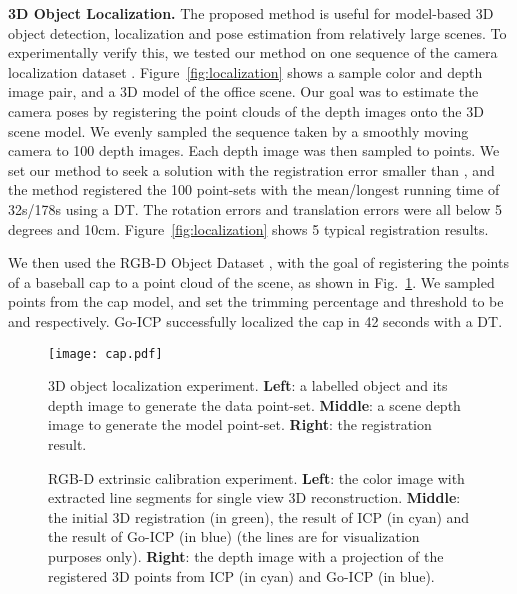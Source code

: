 \documentclass[10pt,journal,cspaper,compsoc]{IEEEtran}
\begin{document}
\vspace{0.06in}
\noindent\textbf{3D Object Localization.}
The proposed method is useful for model-based 3D object detection, localization and pose estimation from relatively large scenes. To experimentally verify this, we tested our method on one sequence of the camera localization dataset \cite{shotton2013scene}. Figure~\ref{fig:localization} shows a sample color and depth image pair, and a 3D model of the office scene. Our goal was to estimate the camera poses by registering the point clouds of the depth images onto the 3D scene model. We evenly sampled the sequence taken by a smoothly moving camera to 100 depth images. Each depth image was then sampled to  points. We set our method to seek a solution with the registration error smaller than , and the method registered the 100 point-sets with the mean/longest running time of 32s/178s using a DT. The rotation errors and translation errors were all below 5 degrees and 10cm. Figure~\ref{fig:localization} shows 5 typical registration results.

We then used the RGB-D Object Dataset \cite{lai2011large}, with the goal of registering the points of a baseball cap to a point cloud of the scene, as shown in Fig.~\ref{fig:cap}. We sampled  points from the cap model, and set the trimming percentage and threshold to be  and  respectively. Go-ICP successfully localized the cap in 42 seconds with a DT.

\begin{figure}[!t]
\begin{center}
\texttt{[image: cap.pdf]}
\caption{3D object localization experiment. \textbf{Left}: a labelled object and its depth image to generate the data point-set. \textbf{Middle}: a scene depth image to generate the model point-set. \textbf{Right}: the registration result.
\label{fig:cap}}
\end{center}
\vspace{-9pt}
\end{figure}

\begin{figure}[!t]
\begin{center}
\!\!
\!\!
\caption{RGB-D extrinsic calibration experiment. \textbf{Left}: the color image with extracted line segments for single view 3D reconstruction. \textbf{Middle}: the initial 3D registration (in green), the result of ICP (in cyan) and the result of Go-ICP (in blue) (the lines are for visualization purposes only). \textbf{Right}: the depth image with a projection of the registered 3D points from ICP (in cyan) and Go-ICP (in blue).
\label{fig:calibration}}
\end{center}
\vspace{-9pt}
\end{figure}
\end{document}
